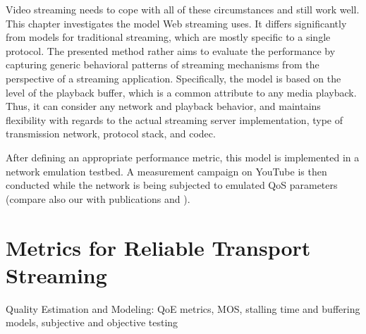 Video streaming needs to cope with all of these circumstances and still work well. This chapter investigates the model Web streaming uses. It differs significantly from models for traditional streaming, which are mostly specific to a single protocol.
The presented method rather aims to evaluate the performance by capturing generic behavioral patterns of streaming mechanisms from the perspective of a streaming application. Specifically, the model is based on the level of the playback buffer, which is a common attribute to any media playback.
Thus, it can consider any network and playback behavior, and maintains flexibility with regards to the actual streaming server implementation, type of transmission network, protocol stack, and codec.

After defining an appropriate performance metric, this model is implemented in a network emulation testbed. A measurement campaign on YouTube is then conducted while the network is being subjected to emulated \gls{QoS} parameters (compare also our with publications \cite{metzger2011delivery} and \cite{6229739}).













\section{Metrics for Reliable Transport Streaming}
\label{c3:metrics}



Quality Estimation and Modeling: QoE metrics, MOS, stalling time and buffering models, subjective and objective testing

